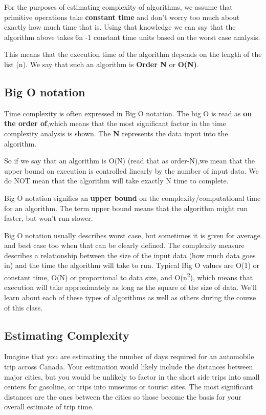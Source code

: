 For the purposes of estimating complexity of algorithms, we assume that primitive operations take \textbf{constant time} and don't worry too much about exactly how much time that is.    Using that knowledge we can say that the algorithm above takes   6n -1 constant time units based on the worst case analysis.   

    This means that the execution time of the algorithm depends on the length of the  list (n).   We say that such an algorithm is \textbf{Order N} or \textbf{O(N)}.

\subsection{Big O notation}

 Time
complexity is often expressed in Big O notation.
The big O is read as
\textbf{on the order of},which means that the most significant factor in the
time complexity analysis is shown.   The \textbf{N}  represents the data input into the algorithm.  

So if we say that an algorithm is
O(N) (read that as order-N),we mean that the upper bound on execution
is controlled linearly by the number of input data.  We do NOT mean that the
algorithm will take exactly N time to complete.  


Big O notation signifies an \textbf{upper bound } on the complexity/computational
time for an algorithm.  The term upper bound means that the algorithm might run faster, but won't run
slower.

Big O notation usually describes worst case, but sometimes it is given
for average and best case too when that can be clearly defined. The
complexity measure describes a relationship between the size of the
input data (how much data goes in) and the time the algorithm will take
to run.  Typical Big O  values are O(1) or constant time, O(N) or proportional to data size, and O(n\textsuperscript{2}), which means that execution will take approximately as long as the square of the size of data.  We'll learn about each of these types of algorithms as well as others during the course of this class.

\subsection{Estimating Complexity}

Imagine that you are estimating the number of days required for an
automobile trip across Canada. Your estimation would likely include the
distances between major cities, but you would be unlikely to factor in
the short side trips into small centers for gasoline, or trips into
museums or tourist sites. The most significant distances are the ones
between the cities so those become the basis for your overall estimate
of trip time.

